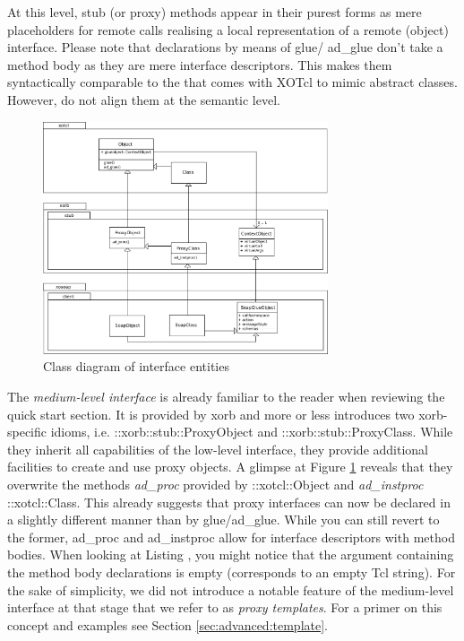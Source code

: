 At this level, stub (or proxy) methods appear in their purest forms as mere placeholders for remote calls realising a local representation of a remote (object) interface. Please note that declarations by means of glue/ ad\_glue don't take a method body as they are mere interface descriptors. This makes them syntactically comparable to the  that comes with XOTcl to mimic abstract classes. However, do not align them at the semantic level.
  \begin{figure}[htbp]
\begin{center}
\includegraphics[width=0.75\textwidth]{img/xorb-xosoap-consumer-interface.png}
\caption{Class diagram of interface entities}
\label{fig:advanced:interface:1}
\end{center}
\end{figure}

The \emph{medium-level interface} is already familiar to the reader when reviewing the quick start section. It is provided by xorb and more or less introduces two xorb-specific idioms, i.e. ::xorb::stub::ProxyObject and ::xorb::stub::ProxyClass. While they inherit all capabilities of the low-level interface, they provide additional facilities to create and use proxy objects. A glimpse at Figure \ref{fig:advanced:interface:1} reveals that they overwrite the methods \emph{ad\_proc} provided by ::xotcl::Object and \emph{ad\_instproc} ::xotcl::Class. This already suggests that proxy interfaces can now be declared in a slightly different manner than by glue/ad\_glue. While you can still revert to the former, ad\_proc and ad\_instproc allow for interface descriptors with method bodies. When looking at Listing , you might notice that the argument containing the method body declarations is empty (corresponds to an empty Tcl string). For the sake of simplicity, we did not introduce a notable feature of the medium-level interface at that stage that we refer to as \emph{proxy templates}. For a primer on this concept and examples see Section \ref{sec:advanced:template}.

